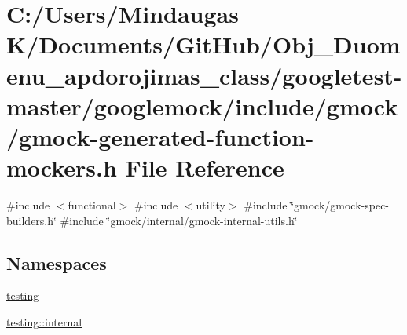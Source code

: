 \hypertarget{googletest-master_2googlemock_2include_2gmock_2gmock-generated-function-mockers_8h}{}\section{C\+:/\+Users/\+Mindaugas K/\+Documents/\+Git\+Hub/\+Obj\+\_\+\+Duomenu\+\_\+apdorojimas\+\_\+class/googletest-\/master/googlemock/include/gmock/gmock-\/generated-\/function-\/mockers.h File Reference}
\label{googletest-master_2googlemock_2include_2gmock_2gmock-generated-function-mockers_8h}
{\ttfamily \#include $<$functional$>$}\newline
{\ttfamily \#include $<$utility$>$}\newline
{\ttfamily \#include \char`\"{}gmock/gmock-\/spec-\/builders.\+h\char`\"{}}\newline
{\ttfamily \#include \char`\"{}gmock/internal/gmock-\/internal-\/utils.\+h\char`\"{}}\newline
\subsection*{Namespaces}
\begin{DoxyCompactItemize}
\item 
 \mbox{\hyperlink{namespacetesting}{testing}}
\item 
 \mbox{\hyperlink{namespacetesting_1_1internal}{testing\+::internal}}
\end{DoxyCompactItemize}
